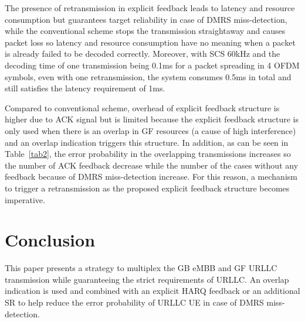 \documentclass[conference]{IEEEtran}
\begin{document}
The presence of retransmission in explicit feedback leads to latency and resource consumption but guarantees target reliability in case of DMRS miss-detection, while the conventional scheme stops the transmission straightaway and causes packet loss so latency and resource consumption have no meaning when a packet is already failed to be decoded correctly. Moreover, with SCS 60kHz and the decoding time of one transmission being 0.1ms for a packet spreading in 4 OFDM symbols, even with one retransmission, the system consumes 0.5ms in total and still satisfies the latency requirement of 1ms.

Compared to conventional scheme, overhead of explicit feedback structure is higher due to ACK signal but is limited because the explicit feedback structure is only used when there is an overlap in GF resources (a cause of high interference) and an overlap indication triggers this structure. In addition, as can be seen in Table~\ref{tab2}, the error probability in the overlapping transmissions increases so the number of ACK feedback decrease while the number of the cases without any feedback because of DMRS miss-detection increase. For this reason, a mechanism to trigger a retransmission as the proposed explicit feedback structure becomes imperative.

\section{Conclusion}\label{IV}

This paper presents a strategy to multiplex the GB eMBB and GF URLLC transmission while guaranteeing the strict requirements of URLLC. An overlap indication is used and combined with an explicit HARQ feedback or an additional SR to help reduce the error probability of URLLC UE in case of DMRS miss-detection.
\end{document}
